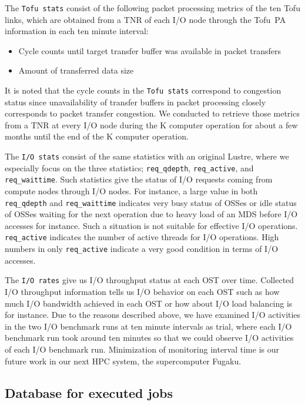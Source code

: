 \documentclass{jhps}
\begin{document}
The {\tt Tofu stats} consist of the following packet processing metrics
of the ten Tofu links, which are obtained from a TNR of each I/O node
through the Tofu~PA information in each ten minute interval:
%
\begin{itemize}
\item Cycle counts until target transfer buffer was available in packet transfers
\item Amount of transferred data size
\end{itemize}
%
It is noted that the cycle counts in the {\tt Tofu stats} correspond to
congestion status since unavailability of transfer buffers in packet processing
closely corresponds to packet transfer congestion.
We conducted to retrieve those metrics from a TNR at every I/O node
during the K computer operation for about a few months
until the end of the K computer operation.

The {\tt I/O stats} consist of the same statistics with an original Lustre,
where we especially focus on the three statistics;
{\tt req\_qdepth}, {\tt req\_active}, and {\tt req\_waittime}.
Such statistics give the status of I/O requests coming from compute nodes through I/O nodes.
For instance, a large value in both {\tt req\_qdepth} and {\tt req\_waittime} indicates
very busy status of OSSes or idle status of OSSes waiting for the next operation
due to heavy load of an MDS before I/O accesses for instance.
Such a situation is not suitable for effective I/O operations.
{\tt req\_active} indicates the number of active threads for I/O operations.
High numbers in only {\tt req\_active} indicate a very good condition
in terms of I/O accesses.

The {\tt I/O rates} give us I/O throughput status at each OST over time.
Collected I/O throughput information tells us I/O behavior on each OST
such as how much I/O bandwidth achieved in each OST or
how about I/O load balancing is for instance.
Due to the reasons described above, we have examined I/O activities
in the two I/O benchmark runs at ten minute intervals as trial,
where each I/O benchmark run took around ten minutes
so that we could observe I/O activities of each I/O benchmark run.
Minimization of monitoring interval time is our future work
in our next HPC system, the supercomputer Fugaku.

\subsection{Database for executed jobs}
\label{ssec:JOB_DB}
\end{document}
